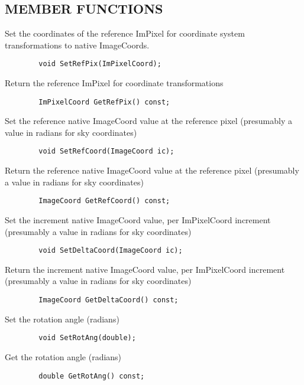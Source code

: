 \subsection*{MEMBER FUNCTIONS}

           Set the coordinates of the reference ImPixel for coordinate
           system transformations to native ImageCoords.
\begin{verbatim}
        void SetRefPix(ImPixelCoord);
\end{verbatim}

           Return the reference ImPixel for coordinate transformations
\begin{verbatim}
        ImPixelCoord GetRefPix() const;
\end{verbatim}

           Set the reference native ImageCoord value at the reference pixel
           (presumably a value in radians for sky coordinates)
\begin{verbatim}
        void SetRefCoord(ImageCoord ic);
\end{verbatim}

           Return the reference native ImageCoord value at the reference pixel
           (presumably a value in radians for sky coordinates)
\begin{verbatim}
        ImageCoord GetRefCoord() const;
\end{verbatim}

           Set the increment native ImageCoord value, per ImPixelCoord
           increment (presumably a value in radians for sky coordinates)
\begin{verbatim}
        void SetDeltaCoord(ImageCoord ic);
\end{verbatim}

           Return the increment native ImageCoord value, per ImPixelCoord
           increment (presumably a value in radians for sky coordinates)
\begin{verbatim}
        ImageCoord GetDeltaCoord() const;
\end{verbatim}

           Set the rotation angle (radians)
\begin{verbatim}
        void SetRotAng(double);
\end{verbatim}

           Get the rotation angle (radians)
\begin{verbatim}
        double GetRotAng() const;
\end{verbatim}

